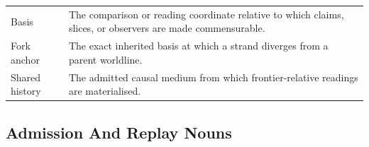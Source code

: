 \documentclass{aion}
\begin{document}
\begin{center}
\begin{tabularx}{\textwidth}{@{}>{\raggedright\arraybackslash}p{}X@{}}
		Basis          & The comparison or reading coordinate relative to which claims, slices, or observers are made commensurable.                                                                                                                 \\
		Fork anchor    & The exact inherited basis at which a strand diverges from a parent worldline.                                                                                                                                               \\
			Shared history & The admitted causal medium from which frontier-relative readings are materialised.                                                                                                                                          \\
			\bottomrule
		\end{tabularx}
		\AIONTableStyleOff
\end{center}

\subsection{Admission And Replay Nouns}
\end{document}
